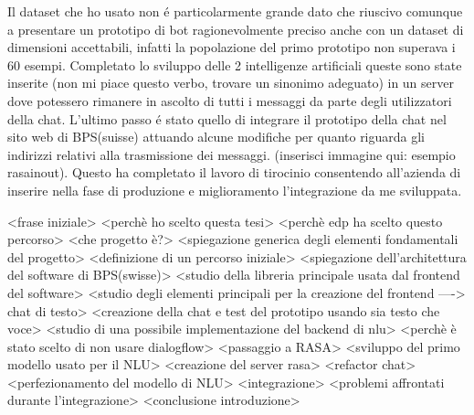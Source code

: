 Il dataset che ho usato non \'e particolarmente grande dato che riuscivo comunque a presentare un prototipo di bot ragionevolmente preciso anche con un dataset di dimensioni accettabili, infatti la popolazione del primo prototipo non superava i 60 esempi.
Completato lo sviluppo delle 2 intelligenze artificiali queste sono state inserite (non mi piace questo verbo, trovare un sinonimo adeguato) in un server dove potessero rimanere in ascolto di tutti i messaggi da parte degli utilizzatori della chat.
L'ultimo passo \'e stato quello di integrare il prototipo della chat nel sito web di BPS(suisse) attuando alcune modifiche per quanto riguarda gli indirizzi relativi alla trasmissione dei messaggi. 
(inserisci immagine qui: esempio rasainout).
Questo ha completato il lavoro di tirocinio consentendo all'azienda di inserire nella fase di produzione e miglioramento l'integrazione da me sviluppata.


<frase iniziale> 
<perchè ho scelto questa tesi>
<perchè edp ha scelto questo percorso>
<che progetto è?>
<spiegazione generica degli elementi fondamentali del progetto>
<definizione di un percorso iniziale>
<spiegazione dell'architettura del software di BPS(swisse)>
<studio della libreria principale usata dal frontend del software>
<studio degli elementi principali per la creazione del frontend ----> chat di testo>
<creazione della chat e test del prototipo usando sia testo che voce>
<studio di una possibile implementazione del backend di nlu>
<perchè è stato scelto di non usare dialogflow>
<passaggio a RASA>
<sviluppo del primo modello usato per il NLU>
<creazione del server rasa>
<refactor chat>
<perfezionamento del modello di NLU>
<integrazione>
<problemi affrontati durante l'integrazione>
<conclusione introduzione>
